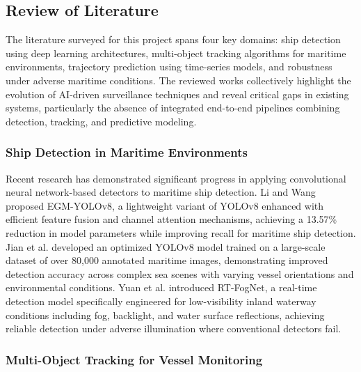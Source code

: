 \subsection{Review of Literature}

The literature surveyed for this project spans four key domains: ship detection using deep learning architectures, multi-object tracking algorithms for maritime environments, trajectory prediction using time-series models, and robustness under adverse maritime conditions. The reviewed works collectively highlight the evolution of AI-driven surveillance techniques and reveal critical gaps in existing systems, particularly the absence of integrated end-to-end pipelines combining detection, tracking, and predictive modeling.

\subsubsection{\textbf{Ship Detection in Maritime Environments}}


Recent research has demonstrated significant progress in applying convolutional neural network-based detectors to maritime ship detection. Li and Wang \citep{Li2025} proposed EGM-YOLOv8, a lightweight variant of YOLOv8 enhanced with efficient feature fusion and channel attention mechanisms, achieving a 13.57\% reduction in model parameters while improving recall for maritime ship detection. Jian et al. \citep{Jian2025} developed an optimized YOLOv8 model trained on a large-scale dataset of over 80,000 annotated maritime images, demonstrating improved detection accuracy across complex sea scenes with varying vessel orientations and environmental conditions. Yuan et al. \citep{Yuan2026} introduced RT-FogNet, a real-time detection model specifically engineered for low-visibility inland waterway conditions including fog, backlight, and water surface reflections, achieving reliable detection under adverse illumination where conventional detectors fail.

\subsubsection{\textbf{Multi-Object Tracking for Vessel Monitoring}}


